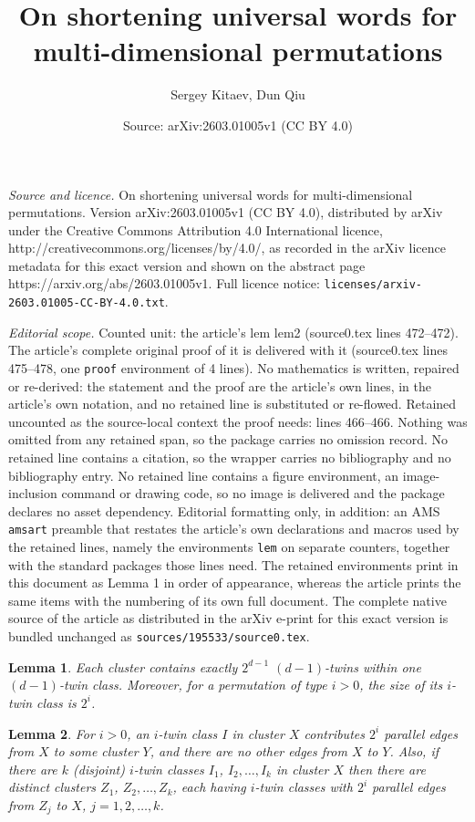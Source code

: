 \documentclass[10pt,a4paper]{amsart}
\title{On shortening universal words for multi-dimensional permutations}
\author{Sergey Kitaev, Dun Qiu}
\date{Source: arXiv:2603.01005v1 (CC BY 4.0)}
\newtheorem{lem}{Lemma}
\begin{document}
\maketitle

\noindent\emph{Source and licence.} On shortening universal words for multi-dimensional permutations. Version arXiv:2603.01005v1 (CC BY 4.0), distributed by arXiv under the Creative Commons Attribution 4.0 International licence, http://creativecommons.org/licenses/by/4.0/, as recorded in the arXiv licence metadata for this exact version and shown on the abstract page https://arxiv.org/abs/2603.01005v1. Full licence notice: \texttt{licenses/arxiv-2603.01005-CC-BY-4.0.txt}.\par\smallskip

\noindent\textit{Editorial scope.} Counted unit: the article's lem lem2 (source0.tex lines 472--472). The article's complete original proof of it is delivered with it (source0.tex lines 475--478, one \texttt{proof} environment of 4 lines). No mathematics is written, repaired or re-derived: the statement and the proof are the article's own lines, in the article's own notation, and no retained line is substituted or re-flowed.  Retained uncounted as the source-local context the proof needs: lines 466--466.  Nothing was omitted from any retained span, so the package carries no omission record.  No retained line contains a citation, so the wrapper carries no bibliography and no bibliography entry.  No retained line contains a figure environment, an image-inclusion command or drawing code, so no image is delivered and the package declares no asset dependency.  Editorial formatting only, in addition: an AMS \texttt{amsart} preamble that restates the article's own declarations and macros used by the retained lines, namely the environments \texttt{lem} on separate counters, together with the standard packages those lines need.  The retained environments print in this document as Lemma 1 in order of appearance, whereas the article prints the same items with the numbering of its own full document.  The complete native source of the article as distributed in the arXiv e-print for this exact version is bundled unchanged as \texttt{sources/195533/source0.tex}.
\begin{lem}\label{lem1}  Each cluster contains exactly $2^{d-1}$ $(d-1)$-twins within one $(d-1)$-twin class. Moreover, for a permutation of type $i>0$, the size of its $i$-twin class is $2^i$. \end{lem}

\begin{lem}\label{lem2} For $i>0$, an $i$-twin class $I$ in cluster $X$ contributes $2^i$ parallel edges from $X$ to some cluster $Y$, and there are no other edges from $X$ to $Y$. Also, if there are $k$ (disjoint) $i$-twin classes $I_1$, $I_2,\ldots,I_k$ in cluster $X$ then there are distinct clusters $Z_1$, $Z_2,\ldots,Z_k$, each having $i$-twin classes with $2^i$ parallel edges from $Z_j$ to $X$, $j=1,2,\ldots,k$. \end{lem}
\end{document}
